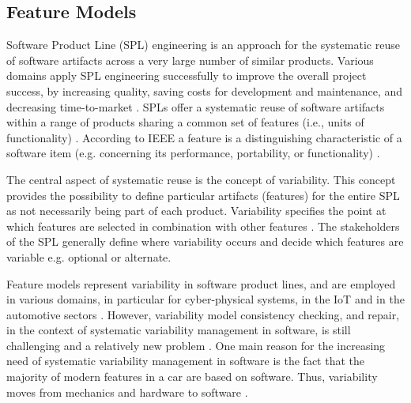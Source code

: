 \subsection{Feature Models}
Software Product Line (SPL) engineering is an approach for the systematic reuse of software artifacts across a very large number of similar products. 
Various domains apply SPL engineering successfully to improve the overall project success, by increasing quality, saving costs for development and maintenance, and decreasing time-to-market \cite{bookSPL2001}. 
SPLs offer a systematic reuse of software artifacts within a range of products sharing a common set of features (i.e., units of functionality) \cite{Griss2000}.
According to IEEE a feature is a distinguishing characteristic of a software item (e.g. concerning its performance, portability, or functionality) \cite{ieeeterminology}.

The central aspect of systematic reuse is the concept of variability. This concept provides the possibility to define particular artifacts (features) for the entire SPL as not necessarily being part of each product. Variability specifies the point at which features are selected in combination with other features \cite{CE00}. The stakeholders of the SPL generally define where variability occurs and decide which features are variable e.g. optional or alternate.

Feature models represent variability in software product lines, and are employed in various domains, in particular for cyber-physical systems, in the IoT and in the automotive sectors \cite{hinterreiter2018feature}.
However, variability model consistency checking, and repair, in the context of systematic variability management in software, is still challenging and a relatively new problem \cite{kretschmer2017abstract}.
One main reason for the increasing need of systematic variability management in software is the fact that the majority of modern features in a car are based on software. Thus, variability moves from mechanics and hardware to software \cite{bosch_spl_nokia,oster_feature_2011}.


